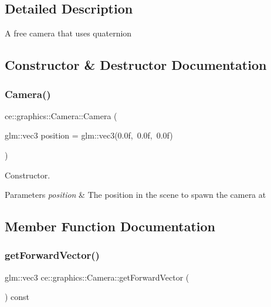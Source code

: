\subsection{Detailed Description}
A free camera that uses quaternion 

\subsection{Constructor \& Destructor Documentation}
\mbox{\label{classce_1_1graphics_1_1_camera_a8bfae7c979a6dab301e66939c48accee}} 
\subsubsection{\texorpdfstring{Camera()}{Camera()}}
{\footnotesize\ttfamily ce\+::graphics\+::\+Camera\+::\+Camera (\begin{DoxyParamCaption}\item[{glm\+::vec3}]{position = {\ttfamily glm\+:\+:vec3(0.0f,~0.0f,~0.0f)} }\end{DoxyParamCaption})}



Constructor. 


\begin{DoxyParams}{Parameters}
{\em position} & The position in the scene to spawn the camera at \\
\hline
\end{DoxyParams}


\subsection{Member Function Documentation}
\mbox{\label{classce_1_1graphics_1_1_camera_a7ca3104f19525600d0314728a4d753d2}} 
\subsubsection{\texorpdfstring{get\+Forward\+Vector()}{getForwardVector()}}
{\footnotesize\ttfamily glm\+::vec3 ce\+::graphics\+::\+Camera\+::get\+Forward\+Vector (\begin{DoxyParamCaption}{ }\end{DoxyParamCaption}) const}



